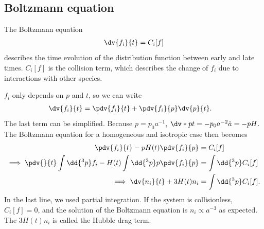 \subsection{Boltzmann equation}
\label{ssec:boltzmann}
The Boltzmann equation
\begin{align*}
	\dv{f_i}{t} = C_i[f]
\end{align*}
describes the time evolution of the distribution function between early and late times. $C_i[f]$ is the collision term, which describes the change of $f_i$ due to interactions with other species.

$f_i$ only depends on $p$ and $t$, so we can write
\begin{align*}
	\dv{f_i}{t} &= \pdv{f_i}{t} + \pdv{f_i}{p} \dv{p}{t}.
\end{align*}
The last term can be simplified. Because $p = p_0 a^{-1}$, $\dv*{p}{t} = -p_0 a^{-2} \dot{a} = - p H$. The Boltzmann equation for a homogeneous and isotropic case then becomes
\begin{align*}
	\pdv{f_i}{t} - p H(t) \pdv{f_i}{p} &= C_i[f]\\
	\implies \pdv{}{t} \int \dd{^3 p} f_i - H(t) \int \dd{^3 p} p \pdv{f_i}{p} &= \int \dd{^3 p} C_i[f]\\
	\implies \dv{n_i}{t} + 3 H(t) n_i &= \int \dd{^3 p} C_i[f].
\end{align*}
In the last line, we used partial integration.
If the system is collisionless, $C_i[f]=0$, and the solution of the Boltzmann equation is $n_i \propto a^{-3}$ as expected. The $3H(t) n_i$ is called the Hubble drag term.

